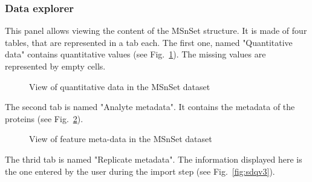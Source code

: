 \documentclass[12pt]{article}
\begin{document}
{\subsubsection {Data explorer}\label{sec:dataexplorer}
This panel allows viewing the content of the MSnSet structure. It is made of 
four tables, that are represented in a tab each. 
The first one, named "Quantitative data" contains quantitative values 
(see Fig.~\ref{fig:sdqv1}). The missing values are represented by empty cells.

\begin {figure}
\centering
{}
\caption{View of quantitative data in the MSnSet dataset}\label{fig:sdqv1}
\end {figure}


The second tab is named "Analyte metadata". It contains the metadata of the 
proteins (see Fig.~\ref{fig:sdqv2}).

\begin {figure}
\centering
{}
\caption{View of feature meta-data in the MSnSet dataset}\label{fig:sdqv2}
\end {figure}

The thrid tab is named "Replicate metadata". The information displayed here 
is the one entered by the user during the import step 
(see Fig.~\ref{fig:sdqv3}).

}
\end{document}
